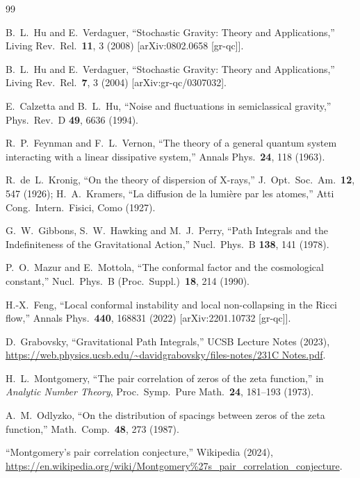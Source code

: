 \documentclass[12pt,a4paper]{article}
\begin{document}
\begin{thebibliography}{99}

B.~L.~Hu and E.~Verdaguer,
``Stochastic Gravity: Theory and Applications,''
Living Rev.\ Rel.\ \textbf{11}, 3 (2008)
[arXiv:0802.0658 [gr-qc]].

B.~L.~Hu and E.~Verdaguer,
``Stochastic Gravity: Theory and Applications,''
Living Rev.\ Rel.\ \textbf{7}, 3 (2004)
[arXiv:gr-qc/0307032].

E.~Calzetta and B.~L.~Hu,
``Noise and fluctuations in semiclassical gravity,''
Phys.\ Rev.\ D \textbf{49}, 6636 (1994).

R.~P.~Feynman and F.~L.~Vernon,
``The theory of a general quantum system interacting with a linear dissipative system,''
Annals Phys.\ \textbf{24}, 118 (1963).

R.~de~L.~Kronig, ``On the theory of dispersion of X-rays,''
J.~Opt.\ Soc.\ Am.\ \textbf{12}, 547 (1926);
H.~A.~Kramers, ``La diffusion de la lumière par les atomes,''
Atti Cong.\ Intern.\ Fisici, Como (1927).

G.~W.~Gibbons, S.~W.~Hawking and M.~J.~Perry,
``Path Integrals and the Indefiniteness of the Gravitational Action,''
Nucl.\ Phys.\ B \textbf{138}, 141 (1978).

P.~O.~Mazur and E.~Mottola,
``The conformal factor and the cosmological constant,''
Nucl.\ Phys.\ B (Proc.\ Suppl.)\ \textbf{18}, 214 (1990).

H.-X.~Feng,
``Local conformal instability and local non-collapsing in the Ricci flow,''
Annals Phys.\ \textbf{440}, 168831 (2022)
[arXiv:2201.10732 [gr-qc]].

D.~Grabovsky,
``Gravitational Path Integrals,''
UCSB Lecture Notes (2023),
\url{https://web.physics.ucsb.edu/~davidgrabovsky/files-notes/231C Notes.pdf}.

H.~L.~Montgomery,
``The pair correlation of zeros of the zeta function,''
in \emph{Analytic Number Theory}, Proc.\ Symp.\ Pure Math.\ \textbf{24}, 181--193 (1973).

A.~M.~Odlyzko,
``On the distribution of spacings between zeros of the zeta function,''
Math.\ Comp.\ \textbf{48}, 273 (1987).

``Montgomery's pair correlation conjecture,''
Wikipedia (2024),
\url{https://en.wikipedia.org/wiki/Montgomery\%27s_pair_correlation_conjecture}.


\end{thebibliography}
\end{document}
